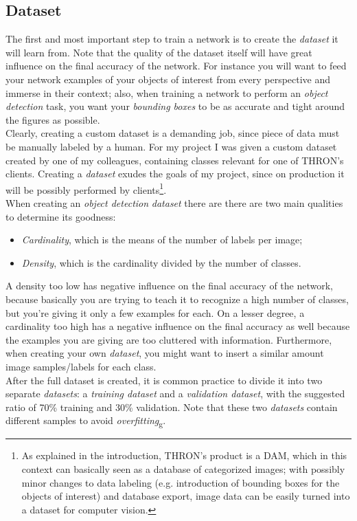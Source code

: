 	\subsection{Dataset}
	The first and most important step to train a network is to create the \emph{dataset} it will learn from. Note that the quality of the dataset itself will have great influence on the final accuracy of the network. For instance you will want to feed your network examples of your objects of interest from every perspective and immerse in their context; also, when training a network to perform an \emph{object detection} task, you want your \emph{bounding boxes} to be as accurate and tight around the figures as possible. \\
	Clearly, creating a custom dataset is a demanding job, since piece of data must be manually labeled by a human. For my project I was given a custom dataset created by one of my colleagues, containing classes relevant for one of THRON's clients. Creating a \emph{dataset} exudes the goals of my project, since on production it will be possibly performed by clients\footnote{As explained in the introduction, THRON's product is a DAM, which in this context can basically seen as a database of categorized images; with possibly minor changes to data labeling (e.g. introduction of bounding boxes for the objects of interest) and database export, image data can be easily turned into a dataset for computer vision.}. \\
	When creating an \emph{object detection} \emph{dataset} there are there are two main qualities to determine its goodness:
	\begin{itemize}
		\item \emph{Cardinality}, which is the means of the number of labels per image;
		\item \emph{Density}, which is the cardinality divided by the number of classes.
	\end{itemize}
A density too low has negative influence on the final accuracy of the network, because basically you are trying to teach it to recognize a high number of classes, but you're giving it only a few examples for each. On a lesser degree, a cardinality too high has  a negative influence on the final accuracy as well because the examples you are giving are too cluttered with information. Furthermore, when creating your own \emph{dataset}, you might want to insert a similar amount image samples/labels for each class. \\
After the full dataset is created, it is common practice to divide it into two separate \emph{datasets}: a \emph{training dataset} and a \emph{validation dataset}, with the suggested ratio of 70\% training and 30\% validation. Note that these two \emph{datasets} contain different samples to avoid \emph{\gls{overfitting}}\textsubscript{g}.

